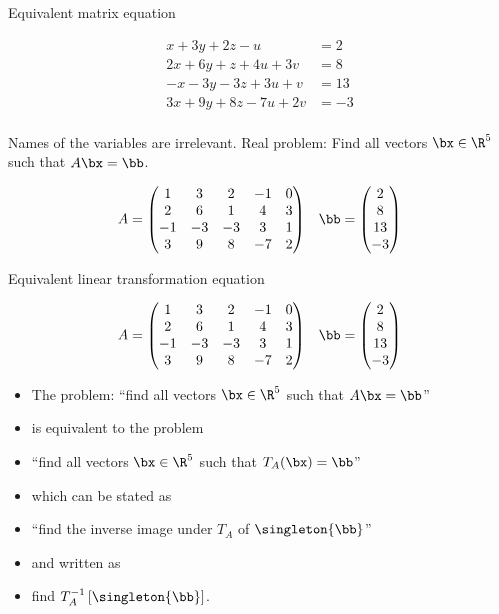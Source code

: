 \documentclass{beamer}
\begin{document}
\begin{frame}{Equivalent matrix equation}

\begin{align*}
 x + 3y + 2z - u  \qquad &= 2 \\
2x + 6y + z + 4u + 3v  &= 8 \\
-x -3y  -3z + 3u + v  &= 13 \\
3x + 9y + 8z  -7u + 2v  &= -3 \\
\end{align*}

Names of the variables are irrelevant. Real problem: Find all vectors $\bx \in \R^5$ such that $A \bx = \bb$.

$$
\begin{matrix}
A =
\begin{pmatrix}
1 & 3 & 2 & -1 & 0 \\
2 & 6 & 1 & 4 & 3\\
-1 & -3 & -3 & 3 & 1 \\
3 & 9 & 8 & -7 & 2
\end{pmatrix}
&
\bb =
\begin{pmatrix}
2 \\ 8 \\ 13 \\ -3
\end{pmatrix}
\end{matrix}
$$

\end{frame}


\begin{frame}{Equivalent linear transformation equation}

$$
\begin{matrix}
A =
\begin{pmatrix}
1 & 3 & 2 & -1 & 0 \\
2 & 6 & 1 & 4 & 3\\
-1 & -3 & -3 & 3 & 1 \\
3 & 9 & 8 & -7 & 2
\end{pmatrix}
&
\bb =
\begin{pmatrix}
2 \\ 8 \\ 13 \\ -3
\end{pmatrix}
\end{matrix}
$$

\begin{itemize}
\item The problem: ``find all vectors $\bx \in \R^5$ such that $A \bx = \bb$''
\item is equivalent to the problem
\item ``find all vectors $\bx \in \R^5$ such that $T_A(\bx) = \bb$''
\item which can be stated as
\item ``find the inverse image under $T_A$ of $\singleton{\bb}$''
\item and written as
\item find $T_A^{-1} \left[ \singleton{\bb}\right]$.
\end{itemize}

\end{frame}
\end{document}
